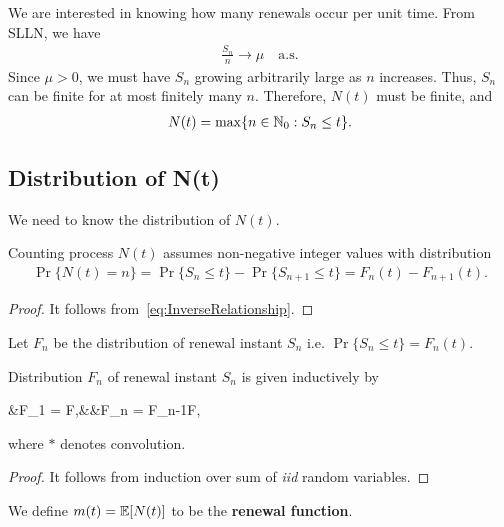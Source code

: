 \documentclass[a4paper,10pt, english]{article}
\begin{document}
\begin{lem}[Finiteness of $N(t)$]
	We are interested in knowing how many renewals occur per unit time. From SLLN, we have 
	\begin{align*} 
	\frac{S_n}{n} \to \mu \quad \mbox{a.s.}
	\end{align*} 
	Since $\mu > 0$, we must have $S_n$ growing arbitrarily large as $n$ increases. Thus,
	$S_n$ can be finite for at most finitely many $n$. Therefore, $N(t)$ must be finite,
	and
	\begin{align*} 
	N(t) = \max\{n \in \mathbb{N}_0 : S_n \leq t\}.
	\end{align*} 
\end{lem}

\subsection{Distribution of N(t)}
We need to know the distribution of $N(t)$. 
\begin{lem} Counting process $N(t)$ assumes non-negative integer values with distribution
	\begin{align*}
	\Pr\{N(t) = n\} = \Pr\{S_n \leq t\} - \Pr\{S_{n+1} \leq t\} = F_n(t) - F_{n+1}(t).
	\end{align*}
\end{lem}
\begin{proof} It follows from~\eqref{eq:InverseRelationship}.
\end{proof}
\begin{defn} Let $F_n$ be the distribution of renewal instant $S_n$ i.e. $\Pr\{S_n \leq t\} = F_n(t)$.
\end{defn}
\begin{lem} Distribution $F_n$ of renewal instant $S_n$  is given inductively by
	\begin{xalignat*}{3}
		&F_1 = F,&&F_n = F_{n-1}\ast F,
	\end{xalignat*}
	where $\ast$ denotes convolution.
\end{lem}
\begin{proof} It follows from induction over sum of \emph{iid} random variables.
\end{proof}
\begin{defn} We define $m(t) = \mathbb{E}[N(t)]$ to be the \textbf{renewal function}.
\end{defn}
\end{document}
